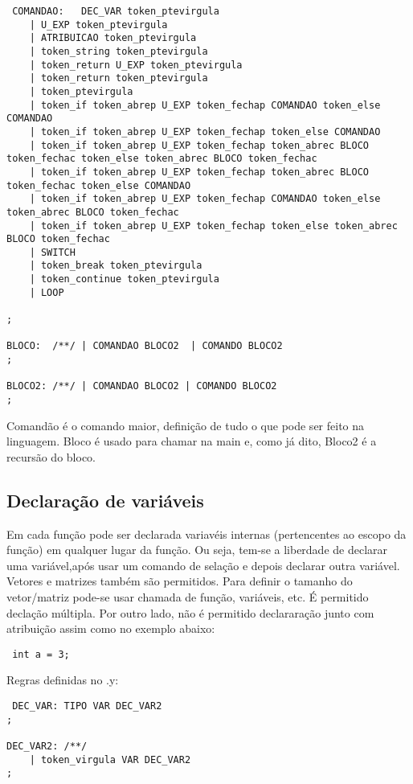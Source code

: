 \documentclass[a4paper,10pt]{article}
\begin{document}
\begin{verbatim}
 COMANDAO:   DEC_VAR token_ptevirgula
	| U_EXP token_ptevirgula
	| ATRIBUICAO token_ptevirgula
	| token_string token_ptevirgula
	| token_return U_EXP token_ptevirgula
	| token_return token_ptevirgula
	| token_ptevirgula
	| token_if token_abrep U_EXP token_fechap COMANDAO token_else COMANDAO
	| token_if token_abrep U_EXP token_fechap token_else COMANDAO
	| token_if token_abrep U_EXP token_fechap token_abrec BLOCO token_fechac token_else token_abrec BLOCO token_fechac
	| token_if token_abrep U_EXP token_fechap token_abrec BLOCO token_fechac token_else COMANDAO
	| token_if token_abrep U_EXP token_fechap COMANDAO token_else token_abrec BLOCO token_fechac
	| token_if token_abrep U_EXP token_fechap token_else token_abrec BLOCO token_fechac
	| SWITCH
	| token_break token_ptevirgula
	| token_continue token_ptevirgula
	| LOOP
	
;

BLOCO:	/**/ | COMANDAO BLOCO2 	| COMANDO BLOCO2
;

BLOCO2: /**/ | COMANDAO BLOCO2 | COMANDO BLOCO2
;
\end{verbatim}

Comandão é o comando maior, definição de tudo o que pode ser feito na linguagem. Bloco é usado para chamar na main e, como já dito, Bloco2 é a recursão do bloco.

\subsection{Declaração de variáveis}

Em cada função pode ser declarada variavéis internas (pertencentes ao escopo da função) em qualquer lugar da função. Ou seja,
tem-se a liberdade de declarar uma variável,após usar um comando de selação e depois declarar outra variável. Vetores e matrizes também são permitidos. 
Para definir o tamanho do vetor/matriz pode-se usar chamada de função, variáveis, etc. É permitido declação múltipla. Por outro lado,
não é permitido declararação junto com atribuição assim como no exemplo abaixo:

\begin{verbatim}
 int a = 3;
\end{verbatim}

Regras definidas no .y:

\begin{verbatim}
 DEC_VAR: TIPO VAR DEC_VAR2
;

DEC_VAR2: /**/ 
	| token_virgula VAR DEC_VAR2
;
\end{verbatim}
\end{document}

